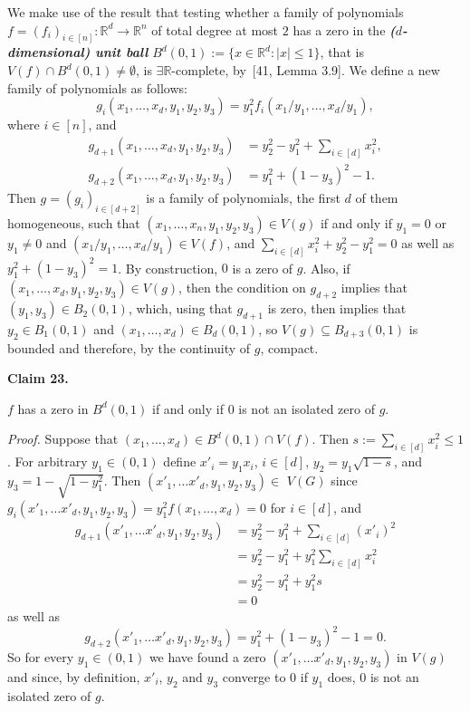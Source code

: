 \documentclass{article}
\newcommand{\defn}[1]{\textit{\textbf{\boldmath #1}}}
\begin{document}
We make use of the result that testing whether a family of polynomials $f = (f_i)_{i \in [n]}: \ensuremath{\mathbb{R}}^d \rightarrow \ensuremath{\mathbb{R}}^n$ of total degree at most $2$ has a zero in the \defn{($d$-dimensional) unit ball} $B^d(0,1) := \{x \in \ensuremath{\mathbb{R}}^d: \lvert x \rvert \leq 1\}$, that is $V(f) \cap B^d(0,1) \neq \emptyset$, is \ensuremath{\exists\mathbb{R}}-complete, by~[41, Lemma 3.9]. We define a new family of polynomials as follows:
\[g_i(x_1, \ldots,x_d,y_1,y_2,y_3) = y_1^2f_i(x_1/y_1,\ldots,x_d/y_1),\]
where $i \in [n]$, and
\begin{align*}
g_{d+1}(x_1, \ldots,x_d,y_1,y_2,y_3) & = y_2^2-y_1^2+\sum_{i \in [d]} x_i^2 ,\\
g_{d+2}(x_1, \ldots,x_d,y_1,y_2,y_3) & = y_1^2+(1-y_3)^2 - 1.
\end{align*}
Then $g = (g_i)_{i \in [d+2]}$ is a family of polynomials, the first $d$ of them homogeneous, such that $(x_1, \ldots, x_n, y_1,y_2,y_3) \in V(g)$ if and only if $y_1 = 0$ or $y_1 \neq 0$ and $(x_1/y_1,\ldots,x_d/y_1) \in V(f)$, and 
$\sum_{i \in [d]} x_i^2 + y_2^2-y_1^2 = 0$ as well as
$y_1^2+(1-y_3)^2 = 1$.
By construction, $0$ is a zero of $g$. Also, if $(x_1,\ldots, x_d, y_1,y_2,y_3) \in V(g)$, then the condition on $g_{d+2}$ implies that $(y_1,y_3) \in B_2(0,1)$, which, using that $g_{d+1}$ is zero, then implies that $y_2 \in B_1(0,1)$ and $(x_1,\ldots, x_d) \in B_d(0,1)$, so $V(g) \subseteq B_{d+3}(0,1)$ is bounded and therefore, by the continuity of $g$, compact. 

\par\medskip\noindent\textbf{Claim 23.} \begin{itshape}
$f$ has a zero in $B^d(0,1)$ if and only if $0$ is not an isolated zero of $g$.
\end{itshape}\par\medskip
\par\noindent\textit{Proof.} 
Suppose that $(x_1, \ldots, x_d) \in B^d(0,1)\cap V(f)$. Then $s := \sum_{i \in [d]} x_i^2 \leq 1$. For arbitrary $y_1 \in (0,1)$ 
define $x'_i = y_1x_i$, $i \in [d]$, $y_2 = y_1 \sqrt{1-s}$, and $y_3 = 1-\sqrt{1-y_1^2}$. 
Then
$(x'_1, \ldots x'_d,y_1,y_2,y_3) \in$ $V(G)$
since $g_i(x'_1, \ldots x'_d,y_1,y_2,y_3) = y_1^2f(x_1,\ldots,x_d) = 0$ for $i \in [d]$, and 
\begin{align*}
   g_{d+1}(x'_1, \ldots x'_d,y_1,y_2,y_3) & = y_2^2-y_1^2+\sum_{i \in [d]} (x'_i)^2  \\
            &= y_2^2-y_1^2+y_1^2 \sum_{i \in [d]} x_i^2 \\
            &= y_2^2-y_1^2+y_1^2 s  \\
            & = 0
\end{align*}
as well as 
\[g_{d+2}(x'_1, \ldots x'_d,y_1,y_2,y_3) =y_1^2 + (1-y_3)^2 -1 = 0.\]
So for every $y_1 \in (0,1)$ we have found a zero $(x'_1, \ldots x'_d,y_1,y_2,y_3)$ in $V(g)$ and since, by definition, $x'_i$, $y_2$ and $y_3$ converge to $0$ if $y_1$ does, $0$ is not an isolated zero of $g$.
\end{document}
